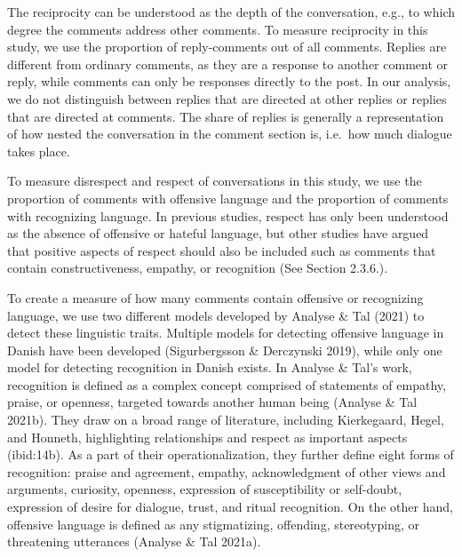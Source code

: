 \documentclass[
]{article}
\begin{document}
The reciprocity can be understood as the depth of the conversation,
e.g., to which degree the comments address other comments. To measure
reciprocity in this study, we use the proportion of reply-comments out
of all comments. Replies are different from ordinary comments, as they
are a response to another comment or reply, while comments can only be
responses directly to the post. In our analysis, we do not distinguish
between replies that are directed at other replies or replies that are
directed at comments. The share of replies is generally a representation
of how nested the conversation in the comment section is, i.e.~how much
dialogue takes place.

To measure disrespect and respect of conversations in this study, we use
the proportion of comments with offensive language and the proportion of
comments with recognizing language. In previous studies, respect has
only been understood as the absence of offensive or hateful language,
but other studies have argued that positive aspects of respect should
also be included such as comments that contain constructiveness,
empathy, or recognition (See Section 2.3.6.).

To create a measure of how many comments contain offensive or
recognizing language, we use two different models developed by Analyse
\& Tal (2021) to detect these linguistic traits. Multiple models for
detecting offensive language in Danish have been developed
(Sigurbergsson \& Derczynski 2019), while only one model for detecting
recognition in Danish exists. In Analyse \& Tal's work, recognition is
defined as a complex concept comprised of statements of empathy, praise,
or openness, targeted towards another human being (Analyse \& Tal
2021b). They draw on a broad range of literature, including Kierkegaard,
Hegel, and Honneth, highlighting relationships and respect as important
aspects (ibid:14b). As a part of their operationalization, they further
define eight forms of recognition: praise and agreement, empathy,
acknowledgment of other views and arguments, curiosity, openness,
expression of susceptibility or self-doubt, expression of desire for
dialogue, trust, and ritual recognition. On the other hand, offensive
language is defined as any stigmatizing, offending, stereotyping, or
threatening utterances (Analyse \& Tal 2021a).
\end{document}
